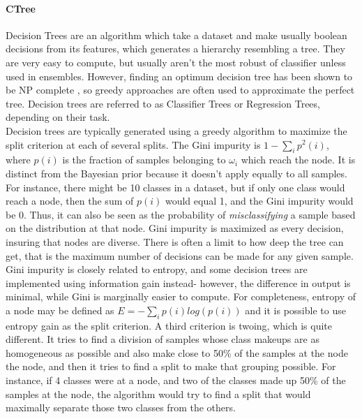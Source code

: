 \paragraph{CTree}
Decision Trees are an algorithm which take a dataset and make usually boolean decisions from its features, which generates a hierarchy resembling a tree.  They are very easy to compute, but usually aren't the most robust of classifier unless used in ensembles.  However, finding an optimum decision tree has been shown to be NP complete \citep{hyafil_constructing_1976}, so greedy approaches are often used to approximate the perfect tree.  Decision trees are referred to as Classifier Trees or Regression Trees, depending on their task.\\
Decision trees are typically generated using a greedy algorithm to maximize the split criterion at each of several splits.  The Gini impurity is $1-\sum_{i}p^2(i)$, where $p(i)$ is the fraction of samples belonging to $\omega_i$ which reach the node.  It is distinct from the Bayesian prior because it doesn't apply equally to all samples.  For instance, there might be 10 classes in a dataset, but if only one class would reach a node, then the sum of $p(i)$ would equal 1, and the Gini impurity would be 0. Thus, it can also be seen as the probability of \textit{misclassifying} a sample based on the distribution at that node. Gini impurity is maximized as every decision, insuring that nodes are diverse.  There is often a limit to how deep the tree can get, that is the maximum number of decisions can be made for any given sample.  Gini impurity is closely related to entropy, and some decision trees are implemented using information gain instead- however, the difference in output is minimal, while Gini is marginally easier to compute.  For completeness, entropy of a node may be defined as $E=-\sum_{i}p(i)log(p(i))$ and it is possible to use entropy gain as the split criterion.  A third criterion is twoing, which is quite different.  It tries to find a division of samples whose class makeups are as homogeneous as possible and also make close to 50\% of the samples at the node the node, and then it tries to find a split to make that grouping possible.  For instance, if 4 classes were at a node, and two of the classes made up 50\% of the samples at the node, the algorithm would try to find a split that would maximally separate those two classes from the others.  
\\
